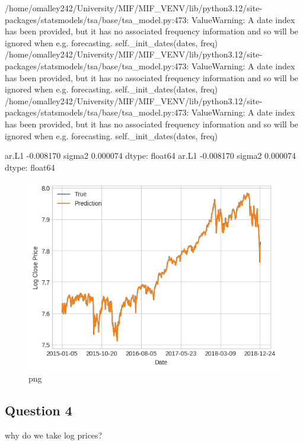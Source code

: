 \begin{python}
/home/omalley242/University/MIF/MIF_VENV/lib/python3.12/site-packages/statsmodels/tsa/base/tsa_model.py:473: ValueWarning: A date index has been provided, but it has no associated frequency information and so will be ignored when e.g. forecasting.
  self._init_dates(dates, freq)
/home/omalley242/University/MIF/MIF_VENV/lib/python3.12/site-packages/statsmodels/tsa/base/tsa_model.py:473: ValueWarning: A date index has been provided, but it has no associated frequency information and so will be ignored when e.g. forecasting.
  self._init_dates(dates, freq)
/home/omalley242/University/MIF/MIF_VENV/lib/python3.12/site-packages/statsmodels/tsa/base/tsa_model.py:473: ValueWarning: A date index has been provided, but it has no associated frequency information and so will be ignored when e.g. forecasting.
  self._init_dates(dates, freq)


ar.L1    -0.008170
sigma2    0.000074
dtype: float64
ar.L1    -0.008170
sigma2    0.000074
dtype: float64
\end{python}

\begin{figure}[h]
\centering
\includegraphics[scale=0.75]{ARMAvsARIMA_files/ARMAvsARIMA_9_2.png}
\caption{png}
\end{figure}

\hypertarget{question-4}{%
\subsection{Question 4}\label{question-4}}

why do we take log prices?
